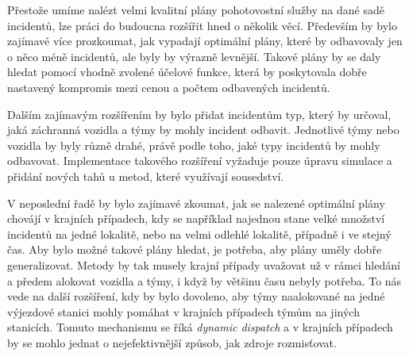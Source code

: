 Přestože umíme nalézt velmi kvalitní plány pohotovostní služby na dané sadě incidentů, lze práci do budoucna rozšířit hned o několik věcí.
Především by bylo zajímavé více prozkoumat, jak vypadají optimální plány, které by odbavovaly jen o něco méně incidentů, ale byly by výrazně levnější.
Takové plány by se daly hledat pomocí vhodně zvolené účelové funkce, která by poskytovala dobře nastavený kompromis mezi cenou a počtem odbavených incidentů. 

Dalším zajímavým rozšířením by bylo přidat incidentům typ, který by určoval, jaká záchranná vozidla a týmy by mohly incident odbavit.
Jednotlivé týmy nebo vozidla by byly různě drahé, právě podle toho, jaké typy incidentů by mohly odbavovat. 
Implementace takového rozšíření vyžaduje pouze úpravu simulace a přidání nových tahů u metod, které využívají sousedství.

V neposlední řadě by bylo zajímavé zkoumat, jak se nalezené optimální plány chovájí v krajních případech, kdy se například najednou stane velké množství incidentů
na jedné lokalitě, nebo na velmi odlehlé lokalitě, případně i ve stejný čas. Aby bylo možné takové plány hledat, je potřeba, aby plány uměly dobře generalizovat.
Metody by tak musely krajní případy uvažovat už v rámci hledání a předem alokovat vozidla a týmy, i když by většinu času nebyly potřeba.
To nás vede na další rozšíření, kdy by bylo dovoleno, aby týmy naalokované na jedné výjezdové stanici mohly pomáhat v krajních případech týmům na jiných stanicích.
Tomuto mechanismu se říká \textit{dynamic dispatch} a v krajních případech by se mohlo jednat o nejefektivnější způsob, jak zdroje rozmisťovat.

